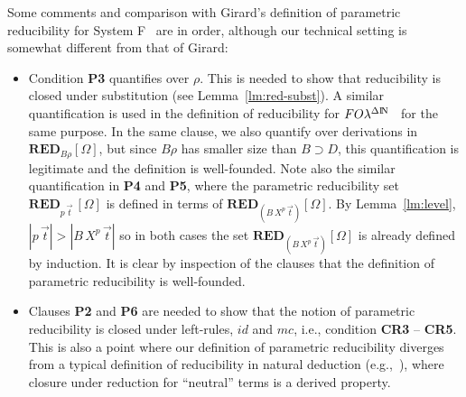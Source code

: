 \documentclass[preprint]{elsarticle}
\newcommand{\FOL   }{FO\lambda}
\newcommand{\FOLDN }{\FOL^{\Delta\N}}
\newcommand{\N}{{\rm I} \! {\rm N}}
\newcommand{\oimp}{\supset}
\def\RED{{\mathbf{RED}}}
\begin{document}
Some comments and comparison with Girard's definition of parametric
reducibility for System F~\cite{girard89book} are in order, although
our technical setting is somewhat different from that of Girard:
\begin{itemize}
\item Condition {\bf P3} quantifies over $\rho$. This is needed to
  show that reducibility is closed under substitution (see
  Lemma~\ref{lm:red-subst}).  A similar quantification is used in the
  definition of reducibility for $\FOLDN$~\cite{mcdowell00tcs} for the
  same purpose.  In the same clause, we also quantify over derivations
  in $\RED_{B\rho}[\Omega]$, but since $B\rho$ has smaller size than
  $B\oimp D$, this quantification is legitimate and the definition is
  well-founded.  Note also the similar quantification in {\bf P4} and
  {\bf P5}, where the parametric reducibility set $\RED_{p\,\vec t} \,
  [\Omega]$ is defined in terms of $\RED_{(B\,X^p\,\vec t)} [\Omega]$.
  By Lemma~\ref{lm:level}, $|p\,\vec t| > |B\,X^p\,\vec t|$ so in both
  cases the set $\RED_{(B\,X^p\,\vec t)} [\Omega]$ is already defined
  by induction. It is clear by inspection of the clauses that the
  definition of parametric reducibility is well-founded.

\item Clauses {\bf P2} and {\bf P6} are needed to show that the notion
  of parametric reducibility is closed under left-rules, $id$ and
  $mc$, i.e., condition {\bf CR3} -- {\bf CR5}. This is also a point
  where our definition of parametric reducibility diverges from a
  typical definition of reducibility in natural deduction
  (e.g.,~\cite{girard89book}), where closure under reduction for
  ``neutral''
  terms is a derived
  property.




\end{itemize}
\end{document}
